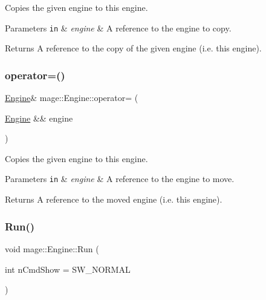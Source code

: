 Copies the given engine to this engine.


\begin{DoxyParams}[1]{Parameters}
\mbox{\tt in}  & {\em engine} & A reference to the engine to copy. \\
\hline
\end{DoxyParams}
\begin{DoxyReturn}{Returns}
A reference to the copy of the given engine (i.\+e. this engine). 
\end{DoxyReturn}
\hypertarget{classmage_1_1_engine_a22607a263e0be5e179cc0e4bf13b18f7}{}\label{classmage_1_1_engine_a22607a263e0be5e179cc0e4bf13b18f7} 
\subsubsection{\texorpdfstring{operator=()}{operator=()}\hspace{0.1cm}{\footnotesize\ttfamily [2/2]}}
{\footnotesize\ttfamily \hyperlink{classmage_1_1_engine}{Engine}\& mage\+::\+Engine\+::operator= (\begin{DoxyParamCaption}\item[{\hyperlink{classmage_1_1_engine}{Engine} \&\&}]{engine }\end{DoxyParamCaption})\hspace{0.3cm}{\ttfamily [delete]}}

Copies the given engine to this engine.


\begin{DoxyParams}[1]{Parameters}
\mbox{\tt in}  & {\em engine} & A reference to the engine to move. \\
\hline
\end{DoxyParams}
\begin{DoxyReturn}{Returns}
A reference to the moved engine (i.\+e. this engine). 
\end{DoxyReturn}
\hypertarget{classmage_1_1_engine_a246c82d0e55bc29e73aecbc365464ec8}{}\label{classmage_1_1_engine_a246c82d0e55bc29e73aecbc365464ec8} 
\subsubsection{\texorpdfstring{Run()}{Run()}}
{\footnotesize\ttfamily void mage\+::\+Engine\+::\+Run (\begin{DoxyParamCaption}\item[{int}]{n\+Cmd\+Show = {\ttfamily SW\+\_\+NORMAL} }\end{DoxyParamCaption})}

